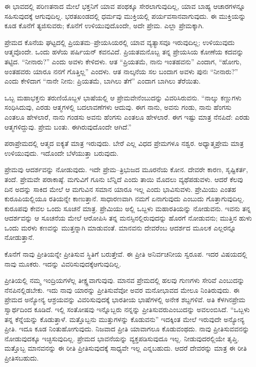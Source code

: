 ಈ ಭಾವದಲ್ಲಿ ಪರಿಣತನಾದ ಮೇಲೆ ಭಕ್ತನಿಗೆ ಯಾವ ಪಂಥಕ್ಕೂ ಸೇರಲಾಗುವುದಿಲ್ಲ, ಯಾವ ಬಾಹ್ಯ ಆಚಾರಗಳನ್ನೂ ಸಹಿಸುವುದಕ್ಕೆ ಆಗುವುದಿಲ್ಲ. ಭರತಖಂಡದಲ್ಲಿ ಧರ್ಮವು ಮುಕ್ತಿಯಲ್ಲಿ ಪರ್ಯವಸಾನವಾಗುವುದು. ಈ ಮುಕ್ತಿಯನ್ನು ಕೂಡ ಕೊನೆಗೆ ತ್ಯಜಿಸುವರು; ಕೊನೆಗೆ ಉಳಿಯುವುದೊಂದೇ, ಅದೇ ಪ್ರೇಮ. ಎಲ್ಲಾ ಪ್ರೇಮಕ್ಕಾಗಿ.

ಪ್ರೇಮದ ಕೊನೆಯ ಘಟ್ಟದಲ್ಲಿ ಪ್ರಿಯತಮ–ಪ್ರೇಯಸಿಯರಲ್ಲಿ ಯಾವ ವ್ಯತ್ಯಾಸವೂ ಇರುವುದಿಲ್ಲ; ಉಳಿಯುವುದು ಆತ್ಮವೊಂದೇ. ಒಂದು ಹಳೆಯ ಪರ್ಷಿಯನ್​ ಕವನವಿದೆ. ಪ್ರಿಯತಮನೊಬ್ಬ ತನ್ನ ಪ್ರೇಯಸಿಯ ಕೋಣೆಯ ಕದವನ್ನು ತಟ್ಟಿದ. “ನೀನಾರು?” ಎಂದು ಅವಳು ಕೇಳಿದಳು. ಆತ “ಪ್ರಿಯತಮೆ, ನಾನು ಇಂತಹವನು” ಎಂದಾಗ, “ಹೋಗು, ಅಂತಹವರು ಯಾರೂ ನನಗೆ ಗೊತ್ತಿಲ್ಲ” ಎಂದಳು. ಆತ ನಾಲ್ಕನೆಯ ಸಲ ಬಂದಾಗ ಅವಳು ಪುನಃ “ನೀನಾರು?” ಎಂದು ಕೇಳಿದಾಗ “ನಾನೇ ನೀನು: ಪ್ರಿಯತಮೆ, ಬಾಗಿಲು ತೆಗೆ” ಎಂದಾಗ ಬಾಗಿಲು ತೆರೆಯಿತು.

ಒಬ್ಬ ಮಹಾಭಕ್ತನು ತರುಣಿಯೊಬ್ಬಳ ಭಾಷೆಯಲ್ಲಿ ಆ ಪ್ರೇಮವೇನೆಂಬುದನ್ನು ವಿವರಿಸಿರುವನು. “ನಾಲ್ಕು ಕಣ್ಣುಗಳು ಸಂಧಿಸಿದುವು, ಎರಡು ಆತ್ಮಗಳಲ್ಲಿ ಬದಲಾವಣೆಗಳು ಆದುವು. ಈಗ ನಾನು, ಅವನು ಗಂಡು, ನಾನು ಹೆಂಗಸು ಎಂತಲೂ ಹೇಳಲಾರೆ, ನಾನು ಗಂಡಸು ಅವನು ಹೆಂಗಸು ಎಂತಲೂ ಹೇಳಲಾರೆ. ಈಗ ಇಷ್ಟು ಮಾತ್ರ ನೆನಪಿದೆ: ಎರಡು ಆತ್ಮಗಳಿದ್ದುವು. ಪ್ರೇಮ ಬಂತು. ಈಗಿರುವುದೊಂದೇ ಆಗಿದೆ.”

ಪರಾಪ್ರೇಮದಲ್ಲಿ ಆತ್ಮದ ಐಕ್ಯತೆ ಮಾತ್ರ ಇರುವುದು. ಬೇರೆ ಎಲ್ಲ ವಿಧದ ಪ್ರೇಮಗಳೂ ನಶ್ವರ. ಅಧ್ಯಾತ್ಮಪ್ರೇಮ ಮಾತ್ರ ಉಳಿಯುವುದು. ಇದೊಂದೇ ಬೆಳೆಯುತ್ತಾ ಬರುವುದು.

ಪ್ರೇಮವು ಆದರ್ಶವನ್ನು ನೋಡುವುದು. ಇದೇ ಪ್ರೇಮ–ತ್ರಿಭುಜದ ಮೂರನೆಯ ಕೋನ. ದೇವರೇ ಕಾರಣ, ಸೃಷ್ಟಿಕರ್ತ, ತಂದೆ. ಪ್ರೇಮವೇ ಪರಾಕಾಷ್ಠೆ. ಮಗುವಿಗೆ ಗೂನು ಬೆನ್ನಿದೆ ಎಂದು ತಾಯಿ ಮೊದಲು ವ್ಯಥೆಪಡುವಳು. ಆದರೆ ಕೆಲವು ದಿನ ಅದನ್ನು ಸಾಕಿದ ಮೇಲೆ ಆ ಮಗುವಿನ ಸಮಾನ ಯಾರೂ ಇಲ್ಲ ಎಂದು ಭಾವಿಸುವಳು. ಪ್ರೇಮಿಯು ಎಂತಹ ಕುರೂಪಿಯಲ್ಲಿಯೂ ರತಿಯನ್ನೇ ಕಾಣುತ್ತಾನೆ. ಸಾಧಾರಣವಾಗಿ ನಮಗೆ ಏನಾಗುವುದು ಎಂಬುದು ಗೊತ್ತಾಗುವುದಿಲ್ಲ. ಕುರೂಪವು ಕೇವಲ ಒಂದು ಸೂಚನೆ ಮಾತ್ರ. ಪ್ರೇಮಿಯು ಅಲ್ಲಿ ಒಬ್ಬಳು ಮಹಾರತಿಯನ್ನು ನೋಡುವನು. ಇವನು ತನ್ನ ಆದರ್ಶವನ್ನು ಆ ಸೂಚನೆಯ ಮೇಲೆ ಆರೋಪಿಸಿ ತನ್ನ ಮನಸ್ಸಿನಲ್ಲಿರುವುದನ್ನು ಹೊರಗೆ ನೋಡುವನು; ಮುತ್ತಿನ ಹುಳು ಒಂದು ಮರಳು ಕಣವನ್ನು ಮುತ್ತನ್ನಾಗಿ ಮಾಡುವಂತೆ. ಮಾನವನು ದೇವರೆಂಬ ಆದರ್ಶದ ಮೂಲಕ ಎಲ್ಲರನ್ನೂ ನೋಡುತ್ತಾನೆ.

ಕೊನೆಗೆ ನಾವು ಪ್ರೀತಿಯನ್ನೇ ಪ್ರೀತಿಸುವ ಸ್ಥಿತಿಗೆ ಬರುತ್ತೇವೆ. ಈ ಪ್ರೀತಿ ಅನಿರ್ವಚನೀಯ ಸ್ವರೂಪ. ಇದರ ವಿಷಯದಲ್ಲಿ ನಾವು ಮೂಕರು. ಇದನ್ನು ವಿವರಿಸುವುದಕ್ಕೆ\break ಆಗುವುದಿಲ್ಲ.

ಪ್ರೀತಿಯಲ್ಲಿ ನಮ್ಮ ಇಂದ್ರಿಯಗಳೆಲ್ಲ ತೀಕ್ಷ್ಣವಾಗುವುವು. ಮಾನವ ಪ್ರೇಮದಲ್ಲಿ ಹಲವು ಗುಣಗಳು ಸೇರಿವೆ ಎಂಬುದನ್ನು ನೆನಪಿನಲ್ಲಿಡಬೇಕು. ಇದು ನಾವು ಯಾರನ್ನು ಪ್ರೀತಿಸುವೆವೋ ಅವರ ಮನೋಭಾವದ ಮೇಲೂ ನಿಂತಿರುವುದು. ಈ ಪ್ರೇಮದ ಅನ್ಯೋನ್ಯ ಆಶ್ರಯವನ್ನು ವಿವರಿಸುವುದಕ್ಕೆ ಭಾರತೀಯ ಭಾಷೆಗಳಲ್ಲಿ ಅನೇಕ ಶಬ್ದಗಳಿವೆ. ಅತಿ ಕೆಳಗಿನ\break ಪ್ರೇಮ ಸ್ವಾರ್ಥದಿಂದ ಕೂಡಿದೆ. ಇಲ್ಲಿ ಸಂತೋಷವು ಇನ್ನೊಬ್ಬರು ನನ್ನನ್ನು ಪ್ರೀತಿಸುವರು\break ಎಂಬುದನ್ನು ಅವಲಂಬಿಸಿದೆ. “ಒಬ್ಬಳು ತನ್ನ ಕೆನ್ನೆಯನ್ನು ಕೊಡುತ್ತಾಳೆ. ಮತ್ತೊಬ್ಬನು ಮುತ್ತುಗಳನ್ನು ಕೊಡುವನು” ಇದಕ್ಕಿಂತ ಮೇಲೆ ಇರುವುದೇ ಅನ್ಯೋನ್ಯ ಪ್ರೀತಿ. ಇದೂ ಕೂಡ ನಿಂತುಹೋಗುವುದು. ನಿಜವಾದ ಪ್ರೀತಿ ಯಾವಾಗಲೂ ಕೊಡುವಂಥದು. ನಾವು ಪ್ರೀತಿಸುವವನನ್ನು ನೋಡುವುದಕ್ಕೂ ಇಚ್ಛಿಸುವುದಿಲ್ಲ. ಪ್ರೇಮದ ಭಾವನೆಯನ್ನು ವ್ಯಕ್ತ\-ಪಡಿಸುವುದೂ ಇಲ್ಲ. ನೀಡುವುದರಲ್ಲಿಯೇ ತೃಪ್ತಿ. ಮತ್ತೊಬ್ಬ ಮಾನವನನ್ನು ಈ ರೀತಿ ಪ್ರೀತಿಸುವುದಕ್ಕೆ ಸಾಧ್ಯವೇ ಇಲ್ಲ ಎನ್ನಬಹುದು. ಆದರೆ ದೇವರನ್ನು ಮಾತ್ರ ಈ ರೀತಿ ಪ್ರೀತಿಸಬಹುದು.

